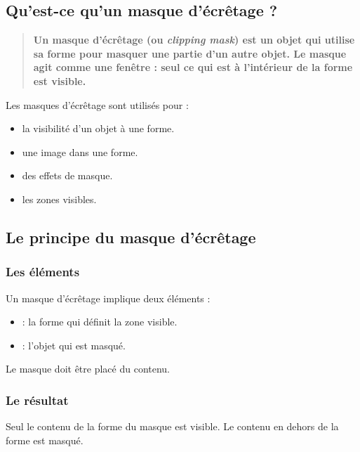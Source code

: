 \subsection{Qu'est-ce qu'un masque d'écrêtage ?}

\begin{quote}
\textbf{Un masque d'écrêtage (ou \emph{clipping mask}) est un objet qui utilise sa forme pour masquer une partie d'un autre objet. Le masque agit comme une fenêtre : seul ce qui est à l'intérieur de la forme est visible.}
\end{quote}

Les masques d'écrêtage sont utilisés pour :

\begin{itemize}
    \item {} la visibilité d'un objet à une forme.
    \item {} une image dans une forme.
    \item {} des effets de masque.
    \item {} les zones visibles.
\end{itemize}

\subsection{Le principe du masque d'écrêtage}

\subsubsection{Les éléments}

Un masque d'écrêtage implique deux éléments :

\begin{itemize}
    \item {} : la forme qui définit la zone visible.
    \item {} : l'objet qui est masqué.
\end{itemize}

Le masque doit être placé  du contenu.

\subsubsection{Le résultat}

Seul le contenu  de la forme du masque est visible. Le contenu en dehors de la forme est masqué.

